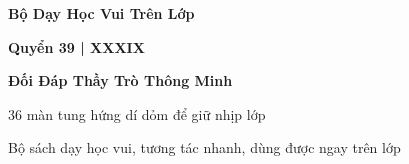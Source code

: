 \begin{titlepage}
\centering
\vspace*{2.2cm}
{\Large\bfseries\color{chapterline} Bộ Dạy Học Vui Trên Lớp\par}
\vspace{0.25cm}
{\large\bfseries\color{chapterline} Quyển 39 \;|\; XXXIX\par}
\vspace{1cm}
{\fontsize{24}{30}\selectfont\bfseries\color{titlecolor} Đối Đáp Thầy Trò Thông Minh\par}
\vspace{0.7cm}
{\large 36 màn tung hứng dí dỏm để giữ nhịp lớp\par}
\vfill
{\normalsize Bộ sách dạy học vui, tương tác nhanh, dùng được ngay trên lớp\par}
\vspace*{1.8cm}
\end{titlepage}
